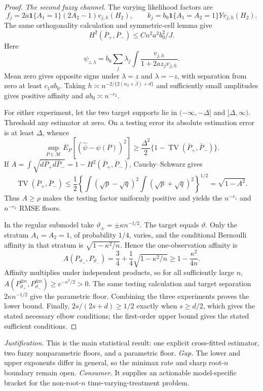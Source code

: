 \documentclass{article}
\begin{document}
\begin{proof}
\emph{The second fuzzy channel.} The varying likelihood factors are
\[f_j=2a\mathbf1\{A_1=1\}(2A_2-1)v_{j,h}(H_2),\qquad k_j=b_0\mathbf1\{A_1=A_2=1\}Yv_{j,h}(H_2).\]
The same orthogonality calculation and symmetric-cell lemma give
\[H^2(\overline P_+,\overline P_-)\le Cn^2a^2b_0^2/J.\]
Here
\[\psi_{z,\lambda}=b_0\sum_j\lambda_j\int\frac{v_{j,h}}{1+2az_jv_{j,h}}.\]
Mean zero gives opposite signs under \(\lambda=z\) and \(\lambda=-z\), with separation from zero at least \(c_1ab_0\). Taking \(h\asymp n^{-2/\{2(\alpha_2+\beta)+d\}}\) and sufficiently small amplitudes gives positive affinity and \(ab_0\asymp n^{-r_2}\).

For either experiment, let the two target supports lie in \( ( -\infty,-\Delta]\) and \([\Delta,\infty)\). Threshold any estimator at zero. On a testing error its absolute estimation error is at least \(\Delta\), whence
\[\sup_{P\in\mathcal M}E_P[(\widehat\psi-\psi(P))^2]\ge\frac{\Delta^2}{2}\{1-\operatorname{TV}(\overline P_+,\overline P_-)\}.\]
If \(A=\int\sqrt{d\overline P_+d\overline P_-}=1-H^2(\overline P_+,\overline P_-)\), Cauchy--Schwarz gives
\[\operatorname{TV}(\overline P_+,\overline P_-)\le\frac12\left\{\int(\sqrt p-\sqrt q)^2\int(\sqrt p+\sqrt q)^2\right\}^{1/2}=\sqrt{1-A^2}.\]
Thus \(A\ge\rho\) makes the testing factor uniformly positive and yields the \(n^{-r_1}\) and \(n^{-r_2}\) RMSE floors.

In the regular submodel take \(\vartheta_\pm=\pm\kappa n^{-1/2}\). The target equals \(\vartheta\). Only the stratum \(A_1=A_2=1\), of probability \(1/4\), varies, and the conditional Bernoulli affinity in that stratum is \(\sqrt{1-\kappa^2/n}\). Hence the one-observation affinity is
\[A(P_{\vartheta_+},P_{\vartheta_-})=\frac34+\frac14\sqrt{1-\kappa^2/n}\ge1-\frac{\kappa^2}{4n}.\]
Affinity multiplies under independent products, so for all sufficiently large \(n\), \(A(P_{\vartheta_+}^{\otimes n},P_{\vartheta_-}^{\otimes n})\ge e^{-\kappa^2/2}>0\). The same testing calculation and target separation \(2\kappa n^{-1/2}\) give the parametric floor. Combining the three experiments proves the lower bound. Finally, \(2s/(2s+d)\ge1/2\) exactly when \(s\ge d/2\), which gives the stated necessary elbow conditions; the first-order upper bound gives the stated sufficient conditions.
\end{proof}
\par\smallskip\noindent \textit{Justification.} This is the main statistical result: one explicit cross-fitted estimator, two fuzzy nonparametric floors, and a parametric floor. \textit{Gap.} The lower and upper exponents differ in general, so the minimax rate and sharp root-\(n\) boundary remain open. \textit{Consumer.} It supplies an actionable model-specific bracket for the non-root-\(n\) time-varying-treatment problem.
\end{document}
